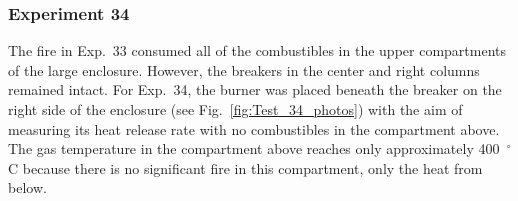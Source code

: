 \documentclass[12pt]{article}
\begin{document}
\clearpage

\subsubsection{Experiment 34}

The fire in Exp.~33 consumed all of the combustibles in the upper compartments of the large enclosure. However, the breakers in the center and right columns remained intact. For Exp.~34, the burner was placed beneath the breaker on the right side of the enclosure (see Fig.~\ref{fig:Test_34_photos}) with the aim of measuring its heat release rate with no combustibles in the compartment above. The gas temperature in the compartment above reaches only approximately 400~$^\circ$C because there is no significant fire in this compartment, only the heat from below.
\end{document}
